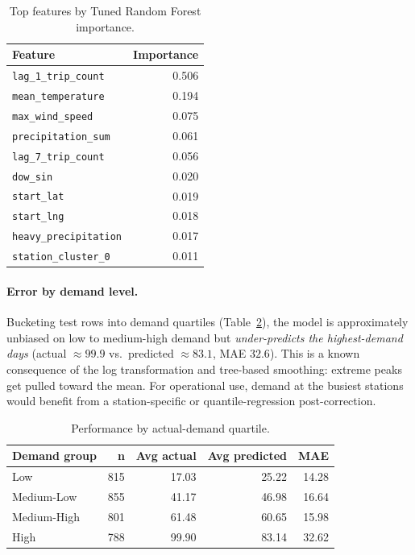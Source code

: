 \documentclass[11pt]{article}
\begin{document}
\begin{table}[H]
\centering
\caption{Top features by Tuned Random Forest importance.}
\label{tab:imp}
\begin{tabular}{lr}
\toprule
\textbf{Feature} & \textbf{Importance} \\
\midrule
\texttt{lag\_1\_trip\_count}   & 0.506 \\
\texttt{mean\_temperature}     & 0.194 \\
\texttt{max\_wind\_speed}      & 0.075 \\
\texttt{precipitation\_sum}    & 0.061 \\
\texttt{lag\_7\_trip\_count}   & 0.056 \\
\texttt{dow\_sin}              & 0.020 \\
\texttt{start\_lat}            & 0.019 \\
\texttt{start\_lng}            & 0.018 \\
\texttt{heavy\_precipitation}  & 0.017 \\
\texttt{station\_cluster\_0}   & 0.011 \\
\bottomrule
\end{tabular}
\end{table}

\paragraph{Error by demand level.}
Bucketing test rows into demand quartiles
(Table~\ref{tab:bias}), the model is approximately unbiased on low to
medium-high demand but \emph{under-predicts the highest-demand days}
(actual $\approx 99.9$ vs.\ predicted $\approx 83.1$, MAE $32.6$). This is a
known consequence of the log transformation and tree-based smoothing: extreme
peaks get pulled toward the mean. For operational use, demand at the busiest
stations would benefit from a station-specific or quantile-regression
post-correction.

\begin{table}[H]
\centering
\caption{Performance by actual-demand quartile.}
\label{tab:bias}
\begin{tabular}{lrrrr}
\toprule
\textbf{Demand group} & \textbf{n} & \textbf{Avg actual} & \textbf{Avg predicted} & \textbf{MAE} \\
\midrule
Low         & 815 & 17.03 & 25.22 & 14.28 \\
Medium-Low  & 855 & 41.17 & 46.98 & 16.64 \\
Medium-High & 801 & 61.48 & 60.65 & 15.98 \\
High        & 788 & 99.90 & 83.14 & 32.62 \\
\bottomrule
\end{tabular}
\end{table}
\end{document}
